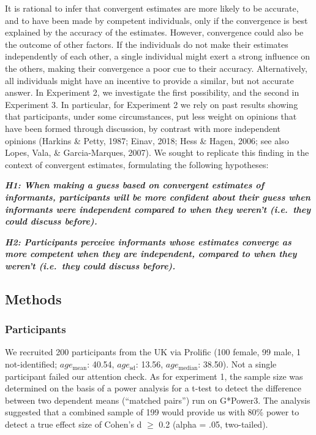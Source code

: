 \documentclass[
  doc,floatsintext]{apa6}
\begin{document}
It is rational to infer that convergent estimates are more likely to be accurate, and to have been made by competent individuals, only if the convergence is best explained by the accuracy of the estimates. However, convergence could also be the outcome of other factors. If the individuals do not make their estimates independently of each other, a single individual might exert a strong influence on the others, making their convergence a poor cue to their accuracy. Alternatively, all individuals might have an incentive to provide a similar, but not accurate answer. In Experiment 2, we investigate the first possibility, and the second in Experiment 3. In particular, for Experiment 2 we rely on past results showing that participants, under some circumstances, put less weight on opinions that have been formed through discussion, by contrast with more independent opinions (Harkins \& Petty, 1987; Einav, 2018; Hess \& Hagen, 2006; see also Lopes, Vala, \& Garcia-Marques, 2007). We sought to replicate this finding in the context of convergent estimates, formulating the following hypotheses:

\textbf{\emph{H1: When making a guess based on convergent estimates of informants, participants will be more confident about their guess when informants were independent compared to when they weren't (i.e.~they could discuss before).}}

\textbf{\emph{H2: Participants perceive informants whose estimates converge as more competent when they are independent, compared to when they weren't (i.e.~they could discuss before).}}

\subsection{Methods}\label{methods-1}

\subsubsection{Participants}\label{participants-1}

We recruited 200 participants from the UK via Prolific (100 female, 99 male, 1 not-identified; \(age_\text{mean}\): 40.54, \(age_\text{sd}\): 13.56, \(age_\text{median}\): 38.50). Not a single participant failed our attention check. As for experiment 1, the sample size was determined on the basis of a power analysis for a t-test to detect the difference between two dependent means (``matched pairs'') run on G*Power3. The analysis suggested that a combined sample of 199 would provide us with 80\% power to detect a true effect size of Cohen's d \(\geq\) 0.2 (alpha = .05, two-tailed).
\end{document}
